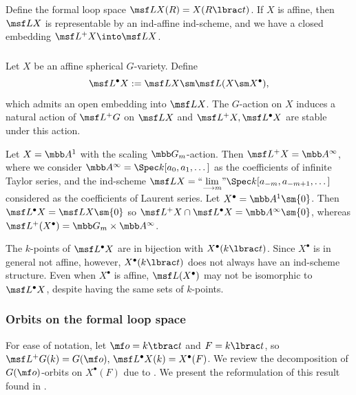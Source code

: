 Define the formal loop space
$\msf L X(R) = X(R\lbrac t)$.
If $X$ is affine, then $\msf L X$ is representable by an ind-affine ind-scheme,
and we have a closed embedding $\msf L^+ X \into \msf L X$.

\subsubsection{}
Let $X$ be an affine spherical $G$-variety.
Define
\[ \msf L^\bullet X := \msf L X \sm \msf L(X\sm X^\bullet), \]
which admits an open embedding into $\msf L X$.
The $G$-action on $X$ induces a natural action of $\msf L^+ G$ on
$\msf L X$ and $\msf L^+X, \msf L^\bullet X$ are stable under this action.


\begin{eg}
\notready \label{eg:A1}
Let $X = \mbb A^1$ with the scaling $\mbb G_m$-action. Then
$\msf L^+ X = \mbb A^\infty$, where we consider $\mbb A^\infty = \Spec k[a_0,a_1,\dotsc]$
as the coefficients of infinite Taylor series, and the ind-scheme
$\msf L X = ``\underset{\longrightarrow m}\lim" \Spec k[a_{-m},a_{-m+1},\dotsc]$ considered
as the coefficients of Laurent series.
Let $X^\bullet = \mbb A^1 \sm \{0\}$. Then $\msf L^\bullet X = \msf L X \sm \{0\}$ so $\msf L^+ X \cap \msf L^\bullet X = \mbb A^\infty \sm \{0\}$, whereas $\msf L^+(X^\bullet) = \mbb G_m \times \mbb A^\infty$.
\end{eg}

\begin{rem}
\notready
The $k$-points of $\msf L^\bullet X$ are in bijection with $X^\bullet(k\lbrac t)$.
Since $X^\bullet$ is in general not affine, however, $X^\bullet(k\lbrac t)$ does not
always have an ind-scheme structure. Even when $X^\bullet$ is affine,
$\msf L(X^\bullet)$ may not be isomorphic to $\msf L^\bullet X$, despite having the same sets of $k$-points.
\end{rem}


\subsubsection{Orbits on the formal loop space} \label{sect:stratLXpoint}

For ease of notation,
let $\mf o = k\tbrac t$ and $F = k\lbrac t$, so
$\msf L^+G(k) = G(\mf o),\, \msf L^\bullet X(k) = X^\bullet(F)$.
We review the decomposition of $G(\mf o)$-orbits on $X^\bullet(F)$ due to \cite{LV}.
We present the reformulation of this result found in \cite[Theorem 3.3.1]{GN}.



